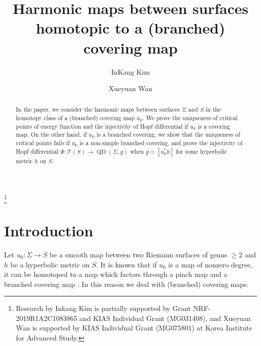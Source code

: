 \documentclass[11pt]{amsart}
\numberwithin{equation}{section}
\def\mc{\mathcal}
\theoremstyle{plain}
\theoremstyle{definition}
\theoremstyle{definition}
\def\op{\operatorname}
\begin{document}
\title{Harmonic maps between  surfaces homotopic to a  (branched) covering map}
\author{InKang Kim}
\author{Xueyuan Wan}


\address{Inkang Kim: School of Mathematics, KIAS, Heogiro 85, Dongdaemun-gu Seoul, 02455, Republic of Korea}

\address{Xueyuan Wan: School of Mathematics, Korea Institute for Advanced Study, Seoul 02455, Republic of Korea}



\begin{abstract}

In the paper, we consider the harmonic maps 
 between surfaces $\Sigma$ and $S$ in the homotopy class of a (branched) covering map $u_0$. We prove the uniqueness of critical points of energy function and the injectivity of Hopf differential if $u_0$ is a covering map.  On the other hand, if $u_0$ is a branched covering, we show that the uniqueness of critical points fails if $u_0$ is a non-simple branched covering, and prove the injectivity of Hopf differential $\Phi:\mc{T}(S)\to \op{QD}(\Sigma,g)$ when $g=[u_0^* h]$ for some hyperbolic metric $h$ on $S$.
 
\end{abstract}


  \thanks{Research by Inkang Kim is partially supported by Grant NRF-2019R1A2C1083865 and KIAS Individual Grant (MG031408), and Xueyuan Wan is supported by KIAS Individual Grant (MG075801) at Korea Institute for Advanced Study.}

\maketitle

\section*{Introduction}

Let $u_0:\Sigma\to S$ be a smooth map between two Riemann surfaces of genus $\geq 2$ and $h$ be a hyperbolic metric on $S$. It is known that if $u_0$ is a map of nonzero degree,  it can be homotoped to a map which factors through a pinch map and a branched covering map \cite{Ed}. In this reason we deal with (branched) covering maps.
\end{document}
